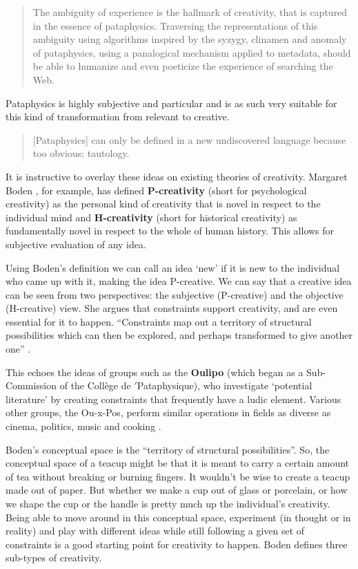 \begin{quote}
  The ambiguity of experience is the hallmark of creativity, that is captured in the essence of pataphysics. Traversing the representations of this ambiguity using algorithms inspired by the syzygy, clinamen and anomaly of pataphysics, using a panalogical mechanism applied to metadata, should be able to humanize and even poeticize the experience of searching the Web. \autocite{Hendler2013}
\end{quote}

Pataphysics is highly subjective and particular and is as such very suitable for this kind of transformation from relevant to creative.

\begin{quote}
  [Pataphysics] can only be defined in a new undiscovered language because too obvious: tautology. \autocite{Baudrillard2007}
\end{quote}

It is instructive to overlay these ideas on existing theories of creativity. Margaret Boden \autocite{Boden2003}, for example, has defined \textbf{P-creativity} (short for psychological creativity) as the personal kind of creativity that is novel in respect to the individual mind and \textbf{H-creativity} (short for historical creativity) as fundamentally novel in respect to the whole of human history. This allows for subjective evaluation of any idea.

Using Boden's definition we can call an idea `new' if it is new to the individual who came up with it, making the idea P-creative. We can say that a creative idea can be seen from two perspectives: the subjective (P-creative) and the objective (H-creative) view. She argues that constraints support creativity, and are even essential for it to happen. ``Constraints map out a territory of structural possibilities which can then be explored, and perhaps transformed to give another one'' \autocite[p.82]{Boden2003}.

This echoes the ideas of groups such as the \textbf{Oulipo} (which began as a Sub-Commission of the Collège de $'$Pataphysique), who investigate `potential literature' by creating constraints that frequently have a ludic element. Various other groups, the Ou-x-Pos, perform similar operations in fields as diverse as cinema, politics, music and cooking \autocite{Motte2007}.

Boden's conceptual space is the ``territory of structural possibilities''. So, the conceptual space of a teacup might be that it is meant to carry a certain amount of tea without breaking or burning fingers. It wouldn't be wise to create a teacup made out of paper. But whether we make a cup out of glass or porcelain, or how we shape the cup or the handle is pretty much up the individual's creativity. Being able to move around in this conceptual space, experiment (in thought or in reality) and play with different ideas while still following a given set of constraints is a good starting point for creativity to happen. Boden defines three sub-types of creativity.

